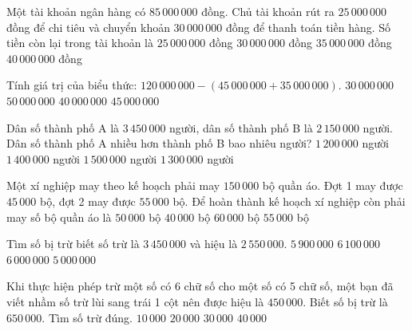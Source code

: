 \begin{ex} %
Một tài khoản ngân hàng có $85\,000\,000$ đồng. Chủ tài khoản rút ra $25\,000\,000$ đồng để chi tiêu và chuyển khoản $30\,000\,000$ đồng để thanh toán tiền hàng. Số tiền còn lại trong tài khoản là
\choice
{$25\,000\,000$ đồng}
{\True $30\,000\,000$ đồng}
{$35\,000\,000$ đồng}
{$40\,000\,000$ đồng}
\end{ex}

\begin{ex} %
Tính giá trị của biểu thức: $120\,000\,000 - (45\,000\,000 + 35\,000\,000)$.
\choice
{$30\,000\,000$}
{$50\,000\,000$}
{\True $40\,000\,000$}
{$45\,000\,000$}
\end{ex}

\begin{ex} %
Dân số thành phố A là $3\,450\,000$ người, dân số thành phố B là $2\,150\,000$ người. Dân số thành phố A nhiều hơn thành phố B bao nhiêu người?
\choice
{$1\,200\,000$ người}
{$1\,400\,000$ người}
{$1\,500\,000$ người}
{\True $1\,300\,000$ người}
\end{ex}

\begin{ex} %
Một xí nghiệp may theo kế hoạch phải may $150\,000$ bộ quần áo. Đợt 1 may được $45\,000$ bộ, đợt 2 may được $55\,000$ bộ. Để hoàn thành kế hoạch xí nghiệp còn phải may số bộ quần áo là
\choice
{\True $50\,000$ bộ}
{$40\,000$ bộ}
{$60\,000$ bộ}
{$55\,000$ bộ}
\end{ex}

\begin{ex} %
Tìm số bị trừ biết số trừ là $3\,450\,000$ và hiệu là $2\,550\,000$.
\choice
{$5\,900\,000$}
{$6\,100\,000$}
{\True $6\,000\,000$}
{$5\,000\,000$}
\end{ex}

\begin{ex} %
Khi thực hiện phép trừ một số có 6 chữ số cho một số có 5 chữ số, một bạn đã viết nhầm số trừ lùi sang trái 1 cột nên được hiệu là $450\,000$. Biết số bị trừ là $650\,000$. Tìm số trừ đúng.
\choice
{$10\,000$}
{\True $20\,000$}
{$30\,000$}
{$40\,000$}
\end{ex}

